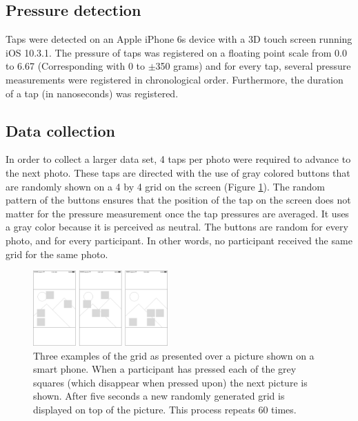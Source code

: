 \documentclass{sigchi}
\begin{document}

\subsection{Pressure detection} %
\label{sub:pressure_detection}
Taps were detected on an Apple iPhone 6s device with a 3D touch screen running iOS 10.3.1. The pressure of taps was registered on a floating point scale from 0.0 to 6.67 (Corresponding with 0 to $\pm$350 grams) and for every tap, several pressure measurements were registered in chronological order. Furthermore, the duration of a tap (in nanoseconds) was registered.

\subsection{Data collection} %
\label{sub:data_collection}
In order to collect a larger data set, 4 taps per photo were required to advance to the next photo. These taps are directed with the use of gray colored buttons that are randomly shown on a 4 by 4 grid on the screen (Figure \ref{fig:grid}). The random pattern of the buttons ensures that the position of the tap on the screen does not matter for the pressure measurement once the tap pressures are averaged. It uses a gray color because it is perceived as neutral. The buttons are random for every photo, and for every participant. In other words, no participant received the same grid for the same photo.
\begin{figure}[h]
    \centering
    \includegraphics[width=0.46\textwidth]{images/Grid.eps}
    \caption{Three examples of the grid as presented over a picture shown on a smart phone. When a participant has pressed each of the grey squares (which disappear when pressed upon) the next picture is shown. After five seconds a new randomly generated grid is displayed on top of the picture. This process repeats 60 times.}
    \label{fig:grid}
\end{figure}
\end{document}
